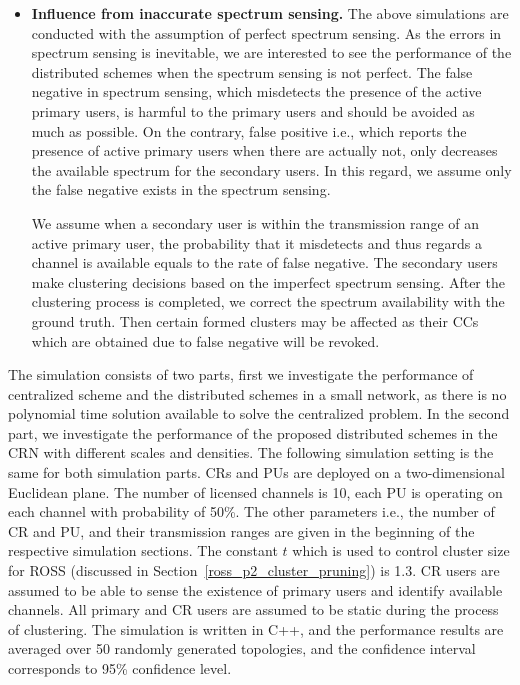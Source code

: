 \documentclass[times]{ettauth}
\newcommand{\ie}{i.e., }
\theoremstyle{mytheoremstyle}
\theoremstyle{mytheoremstyle}
\theoremstyle{mytheoremstyle}
\begin{document}
\begin{itemize}
\item \textbf{Influence from inaccurate spectrum sensing.}
The above simulations are conducted with the assumption of perfect spectrum sensing.
As the errors in spectrum sensing is inevitable, we are interested to see the performance of the distributed schemes when the spectrum sensing is not perfect.
The false negative in spectrum sensing, which misdetects the presence of the active primary users, is harmful to the primary users and should be avoided as much as possible.
On the contrary, false positive \ie which reports the presence of active primary users when there are actually not, only decreases the available spectrum for the secondary users.
In this regard, we assume only the false negative exists in the spectrum sensing.

We assume when a secondary user is within the transmission range of an active primary user, the probability that it misdetects and thus regards a channel is available equals to the rate of false negative.
The secondary users make clustering decisions based on the imperfect spectrum sensing.
After the clustering process is completed, we correct the spectrum availability with the ground truth.
Then certain formed clusters may be affected as their CCs which are obtained due to false negative will be revoked.
\end{itemize}


The simulation consists of two parts, first we investigate the performance of centralized scheme and the distributed schemes in a small network, as there is no polynomial time solution available to solve the centralized problem.
In the second part, we investigate the performance of the proposed distributed schemes in the CRN with different scales and densities.
The following simulation setting is the same for both simulation parts.
CRs and PUs are deployed on a two-dimensional Euclidean plane.
The number of licensed channels is 10, each PU is operating on each channel with probability of 50\%.
The other parameters \ie the number of CR and PU, and their transmission ranges are given in the beginning of the respective simulation sections.
The constant $t$ which is used to control cluster size for ROSS (discussed in Section~\ref{ross_p2_cluster_pruning}) is 1.3.
CR users are assumed to be able to sense the existence of primary users and identify available channels.
All primary and CR users are assumed to be static during the process of clustering.
The simulation is written in C++, and the performance results are averaged over 50 randomly generated topologies, and the confidence interval corresponds to 95\% confidence level.
\end{document}
